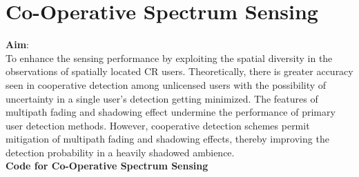 \documentclass[a4paper]{article}
\begin{document}
\section{Co-Operative Spectrum Sensing}
\textbf{\large{Aim}}:\\[10pt]
To enhance the sensing performance by exploiting the spatial diversity in
the observations of spatially located CR users. Theoretically, there is greater
accuracy seen in cooperative detection among unlicensed users with the
possibility of uncertainty in a single user’s detection getting minimized.
The features of multipath fading and shadowing effect undermine the performance of primary user detection methods. However, cooperative detection schemes permit mitigation of multipath fading and shadowing effects, thereby improving the detection probability in a heavily shadowed ambience.\\[10pt]
\textbf{Code for Co-Operative Spectrum Sensing}\\
\end{document}
